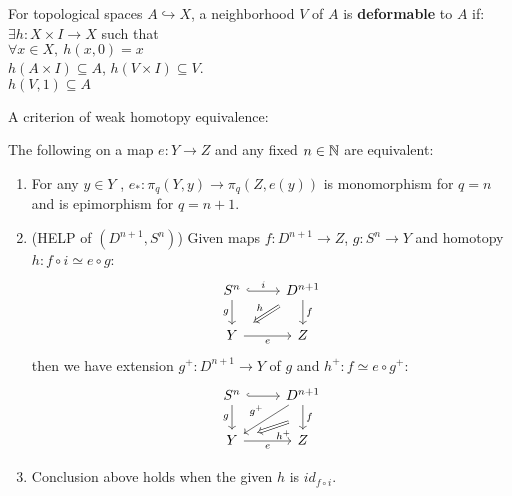     \begin{defn}
        For topological spaces $A \hookrightarrow X$, 
        a neighborhood $V$ of $A$ is \textbf{deformable}\label{hyp:deformable} to $A$ if:\\
        $\exists h : X \times I \to X$ such that\\
        $\forall x \in X,\ h(x,0) = x$\\
        $h(A \times I) \subseteq A$, $h(V \times I) \subseteq V$.\\
        $h(V,1) \subseteq A$
    \end{defn}

    A criterion of weak homotopy equivalence:
    \begin{lem}
        \label{hyp:criterion-HELP-Dn+1,Sn}
        The following on a map $e : Y \to Z$ and any fixed $n \in \mathbb N$ are equivalent:\\
        \begin{enumerate}
            \item For any $y \in Y$ , $e_* : \pi_q(Y,y) \to \pi_q(Z,e(y))$
                is monomorphism for $q = n$ and is epimorphism for $q = n+1$.
            \item (HELP of $(D^{n+1},S^n)$) Given maps $f : D^{n+1} \to Z$, $g : S^n \to Y$
            and homotopy $h : f \circ i \simeq e \circ g $:
            \[\begin{tikzcd}
                {S^n} & {D^{n+1}} \\
                Y & Z
                \arrow["g"', from=1-1, to=2-1]
                \arrow["e"', from=2-1, to=2-2]
                \arrow["i", hook, from=1-1, to=1-2]
                \arrow["f", from=1-2, to=2-2]
                \arrow["h"', shorten <=8pt, shorten >=8pt, Rightarrow, from=1-2, to=2-1]
            \end{tikzcd}\]
            then we have extension $g^+ : D^{n+1} \to Y$ of $g$
            and $h^+ : f \simeq e \circ g^+$:
            \[\begin{tikzcd}
                S^n & D^{n+1} \\
                Y & Z
                \arrow["g"', from=1-1, to=2-1]
                \arrow[hook, from=1-1, to=1-2]
                \arrow[""{name=0, anchor=center, inner sep=0}, "f", from=1-2, to=2-2]
                \arrow["e"', from=2-1, to=2-2]
                \arrow["{g^+}"', from=1-2, to=2-1]
                \arrow["{h^+}", shorten <=10pt, shorten >=10pt, Rightarrow, from=0, to=2-1]
            \end{tikzcd}\]
            \item Conclusion above holds when the given $h$ is $id_{f \circ i}$.
        \end{enumerate}
    \end{lem}

